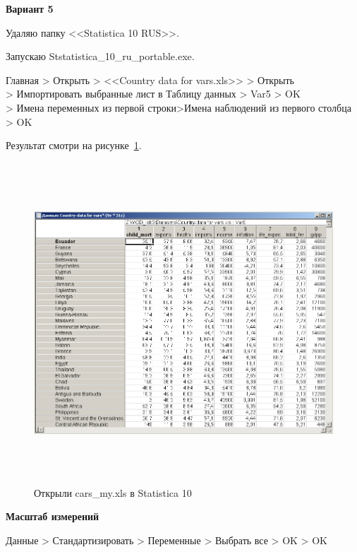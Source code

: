 \newpage

\begin{center}
  \textbf{Вариант 5}
\end{center}

Удаляю папку <<Statistica 10 RUS>>.

Запускаю Ststatistica\_10\_ru\_portable.exe.

Главная > Открыть > <<Country data for vars.xls>> > Открыть \\
> Импортировать выбранные лист в Таблицу данных > Var5 > OK \\
> Имена переменных из первой строки>Имена наблюдений из первого столбца > OK

Результат смотри на рисунке~\ref{fig:var5__1_1}.

\begin{figure}[!h]
  \centering

  \includegraphics[height=12cm]
  {inc/cars_my/var5__1_1.PNG}

  \caption{Открыли cars\_my.xls в Statistica 10}

  \label{fig:var5__1_1}
\end{figure}

\begin{center}
  \textbf{Масштаб измерений}
\end{center}

Данные > Стандартизировать > Переменные > Выбрать все > OK > OK

